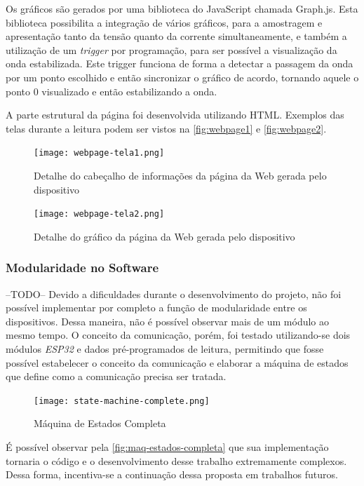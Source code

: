 Os gráficos são gerados por uma biblioteca do JavaScript chamada Graph.js. Esta biblioteca possibilita a integração de vários gráficos, para a amostragem e apresentação tanto da tensão quanto da corrente simultaneamente, e também a utilização de um \textit{trigger} por programação, para ser possível a visualização da onda estabilizada. Este trigger funciona de forma a detectar a passagem da onda por um ponto escolhido e então sincronizar o gráfico de acordo, tornando aquele o ponto 0 visualizado e então estabilizando a onda.

A parte estrutural da página foi desenvolvida utilizando \gls{HTML}. Exemplos das telas durante a leitura podem ser vistos na \autoref{fig:webpage1} e \autoref{fig:webpage2}.

\begin{figure}[h!]
    \centering
    \caption{Detalhe do cabeçalho de informações da página da Web gerada pelo dispositivo}
    \texttt{[image: webpage-tela1.png]}
    \label{fig:webpage1}
    \fonte{}
\end{figure}

\begin{figure}[h!]
    \centering
    \caption{Detalhe do gráfico da página da Web gerada pelo dispositivo}
    \texttt{[image: webpage-tela2.png]}
    \label{fig:webpage2}
    \fonte{}
\end{figure}

\subsubsection{Modularidade no Software}\label{modular-softw}
--TODO--
Devido a dificuldades durante o desenvolvimento do projeto, não foi possível implementar por completo a função de modularidade entre os dispositivos. Dessa maneira, não é possível observar mais de um módulo ao mesmo tempo.
O conceito da comunicação, porém, foi testado utilizando-se dois módulos \textit{ESP32} e dados pré-programados de leitura, permitindo que fosse possível estabelecer o conceito da comunicação e elaborar a máquina de estados que define como a comunicação precisa ser tratada.

\begin{figure}[h!]
    \centering
    \caption{Máquina de Estados Completa}
    \texttt{[image: state-machine-complete.png]}
    \label{fig:maq-estados-completa}
    \fonte{}
\end{figure}

É possível observar pela \autoref{fig:maq-estados-completa} que sua implementação tornaria o código e o desenvolvimento desse trabalho extremamente complexos. Dessa forma, incentiva-se a continuação dessa proposta em trabalhos futuros.

